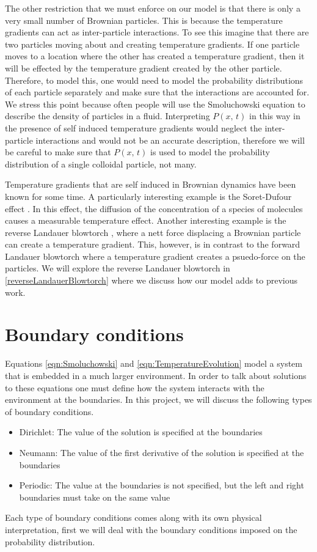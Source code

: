 The other restriction that we must enforce on our model is that there is only a very small number of Brownian particles. This is because the temperature gradients can act as inter-particle interactions. To see this imagine that there are two particles moving about and creating temperature gradients. If one particle moves to a location where the other has created a temperature gradient, then it will be effected by the temperature gradient created by the other particle. Therefore, to model this, one would need to model the probability distributions of each particle separately and make sure that the interactions are accounted for. We stress this point because often people will use the Smoluchowski equation to describe the density of particles in a fluid. Interpreting $P(x, \, t)$ in this way in the presence of self induced temperature gradients would neglect the inter-particle interactions and would not be an accurate description, therefore we will be careful to make sure that $P(x, \, t)$ is used to model the probability distribution of a single colloidal particle, not many.  

Temperature gradients that are self induced in Brownian dynamics have been known for some time. A particularly interesting example is the Soret-Dufour effect \cite{Onsager1931,HortLinzLuecke1992,PiazzaGuarino2002,Santamaria-HolekGadomskiRubi2011}. In this effect, the diffusion of the concentration of a species of molecules causes a measurable temperature effect. Another interesting example is the reverse Landauer blowtorch \cite{DasDasBarikEtAl2015}, where a nett force displacing a Brownian particle can create a temperature gradient. This, however, is in contrast to the forward Landauer blowtorch where a temperature gradient creates a psuedo-force on the particles. We will explore the reverse Landauer blowtorch in \autoref{reverseLandauerBlowtorch} where we discuss how our model adds to previous work.

\section{Boundary conditions}
Equations \ref{eqn:Smoluchowski} and \ref{eqn:TemperatureEvolution} model a system that is embedded in a much larger environment. In order to talk about solutions to these equations one must define how the system interacts with the environment at the boundaries. In this project, we will discuss the following types of boundary conditions.

\begin{itemize}
\item{Dirichlet: The value of the solution is specified at the boundaries}
\item{Neumann: The value of the first derivative of the solution is specified at the boundaries}
\item{Periodic: The value at the boundaries is not specified, but the left and right boundaries must take on the same value}
\end{itemize}
Each type of boundary conditions comes along with its own physical interpretation, first we will deal with the boundary conditions imposed on the probability distribution.

